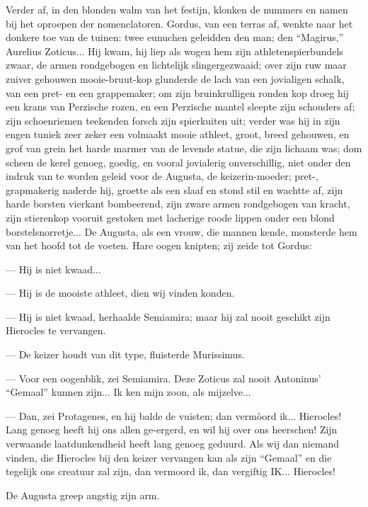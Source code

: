 \documentclass[a4paper, 12pt, oneside, dutch]{article}
\begin{document}
Verder af, in den blonden walm van het festijn, klonken de nummers en namen bij het oproepen der nomenclatoren. Gordus, van een terras af, wenkte naar het donkere toe van de tuinen: twee eunuchen geleidden den man; den "`Magirus,"' Aurelius Zoticus... Hij kwam, hij liep als wogen hem zijn athletenspierbundels zwaar, de armen rondgebogen en lichtelijk slingergezwaaid; over zijn ruw maar zuiver gehouwen mooie-bruut-kop glunderde de lach van een jovialigen schalk, van een pret- en een grappemaker; om zijn bruinkrulligen ronden kop droeg hij een krans van Perzische rozen, en een Perzische mantel sleepte zijn schouders af; zijn schoenriemen teekenden forsch zijn spierkuiten uit; verder was hij in zijn engen tuniek zeer zeker een volmaakt mooie athleet, groot, breed gehouwen, en grof van grein het harde marmer van de levende statue, die zijn lichaam was; dom scheen de kerel genoeg, goedig, en vooral jovialerig onverschillig, niet onder den indruk van te worden geleid voor de Augusta, de keizerin-moeder; pret-, grapmakerig naderde hij, groette als een slaaf en stond stil en wachtte af, zijn harde borsten vierkant bombeerend, zijn zware armen rondgebogen van kracht, zijn stierenkop vooruit gestoken met lacherige roode lippen onder een blond borstelsnorretje... De Augusta, als een vrouw, die mannen kende, monsterde hem van het hoofd tot de voeten. Hare oogen knipten; zij zeide tot Gordus:

--- Hij is niet kwaad...

--- Hij is de mooiste athleet, dien wij vinden konden.

--- Hij is niet kwaad, herhaalde Semiamira; maar hij zal nooit geschikt zijn Hierocles te vervangen.

--- De keizer houdt van dit type, fluisterde Murissimus.

--- Voor een oogenblik, zei Semiamira. Deze Zoticus zal nooit Antoninus' "`Gemaal"' kunnen zijn... Ik ken mijn zoon, als mijzelve...

--- Dan, zei Protagenes, en hij balde de vuisten; dan vermòord ik... Hierocles! Lang genoeg heeft hij ons allen ge-ergerd, en wil hij over ons heerschen! Zijn verwaande laatdunkendheid heeft lang genoeg geduurd. Als wij dan niemand vinden, die Hierocles bij den keizer vervangen kan als zijn "`Gemaal"' en die tegelijk ons creatuur zal zijn, dan vermoord ik, dan vergiftig IK... Hierocles!

De Augusta greep angstig zijn arm.
\end{document}
